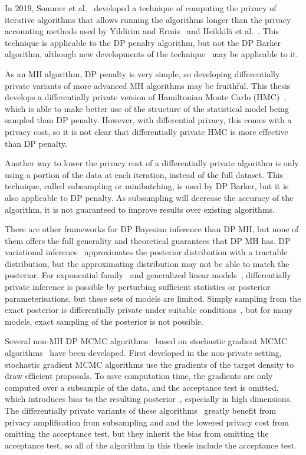 \documentclass[english,twoside,openright]{HYgraduMLDS}
\begin{document}
In 2019, Sommer et al.~\cite{Sommer2019} developed a technique of
computing the privacy of
iterative algorithms that allows running the algorithms longer than the
privacy accounting methods used by Yildirim and Ermis~\cite{YildirimE19} and
Heikkilä et al.~\cite{HeikkilaJDH19}. This technique is applicable to the
DP penalty algorithm, but not the DP Barker algorithm, although new developments
of the technique~\cite{KJH20} may be applicable to it.

As an MH algorithm, DP penalty is very simple, so developing differentially
private variants of more advanced MH algorithms may be fruithful. This thesis
develops a differentially private version of
Hamiltonian Monte Carlo (HMC)~\cite{neal2012mcmc, DKP87}, which is able to make
better use of the structure of the statistical model being sampled than DP penalty.
However, with differential privacy, this comes with a privacy cost, so it is
not clear that differentially private HMC is more effective than DP penalty.

Another way to lower the privacy cost of a differentially private
algorithm is only using a portion of the data at each iteration, instead of
the full dataset. This technique, called subsampling or minibatching, is used
by DP Barker, but it is also applicable to DP penalty. As subsampling will
decrease the accuracy of the algorithm, it is not guaranteed to improve results
over existing algorithms.

There are other frameworks for DP Bayesian inference than DP MH, but none
of them offers the full generality and theoretical guarantees that DP MH
has. DP variational inference~\cite{JHD17} approximates the posterior
distribution with a tractable distribution, but the approximating distribution
may not be able to match the posterior. For exponential
family~\cite{BernsteinS18} and generalized linear models~\cite{KJK20},
differentially private inference is possible by perturbing sufficient statistics
or posterior parameterisations, but these sets of models are limited. Simply sampling
from the exact posterior is differentially private under suitable
conditions~\cite{DNZ17, WFS15, ZRD16}, but for many models, exact sampling of the posterior
is not possible.

Several non-MH DP MCMC algorithms~\cite{WFS15, LCL19} based on
stochastic gradient MCMC algorithms~\cite{WellingT11, CFG14, DFB14} have been developed.
First developed in the non-private setting, stochastic gradient MCMC
algorithms use the gradients of the target density
to draw efficient proposals. To save computation time, the gradients are
only computed over a subsample of the data, and the acceptance test is omitted,
which introduces bias to the resulting posterior~\cite{Bet15}, especially in
high dimensions.
The differentially private variants of these algorithms~\cite{WFS15, LCL19} greatly
benefit from privacy amplification from subsampling and and the lowered
privacy cost from omitting the acceptance test,
but they inherit the bias from omitting the acceptance test, so all of the
algorithm in this thesis include the acceptance test.
\end{document}
